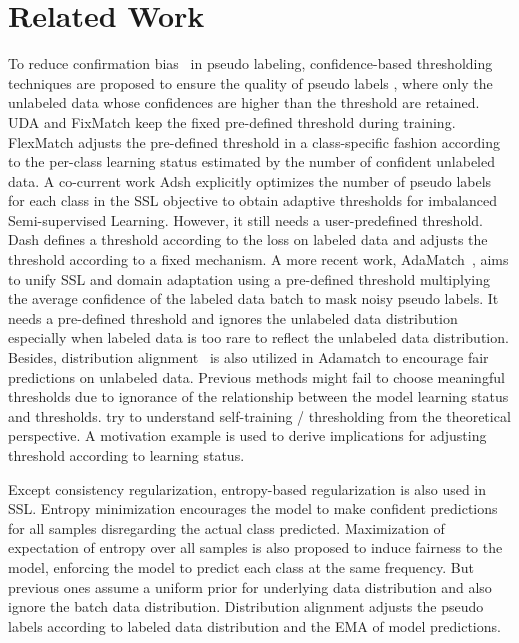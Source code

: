 \documentclass{article} \usepackage{iclr2023_conference,times}
\theoremstyle{plain}
\theoremstyle{definition}
\theoremstyle{remark}
\begin{document}
\section{Related Work}





To reduce confirmation bias~\citep{arazo2020pseudo} in pseudo labeling, confidence-based thresholding techniques are proposed to ensure the quality of pseudo labels \citep{xie2020unsupervised,sohn2020fixmatch,zhang2021flexmatch,xu2021dash}, where only the unlabeled data whose confidences are higher than the threshold are retained. UDA \citep{xie2020unsupervised} and FixMatch \citep{sohn2020fixmatch} keep the fixed pre-defined threshold during training. FlexMatch \citep{zhang2021flexmatch} adjusts the pre-defined threshold in a class-specific fashion according to the per-class learning status estimated by the number of confident unlabeled data. A co-current work Adsh \citep{guo2022class} explicitly optimizes the number of pseudo labels for each class in the SSL
objective to obtain adaptive thresholds for imbalanced Semi-supervised Learning. However, it still needs a user-predefined threshold. Dash \citep{xu2021dash} defines a threshold according to the loss on labeled data and adjusts the threshold according to a fixed mechanism. A more recent work, AdaMatch~\citep{berthelot2021adamatch}, aims to unify SSL and domain adaptation using a pre-defined threshold multiplying the average confidence of the labeled data batch to mask noisy pseudo labels. It needs a pre-defined threshold and ignores the unlabeled data distribution especially when labeled data is too rare to reflect the unlabeled data distribution. Besides, distribution alignment~\citep{berthelot2019remixmatch,berthelot2021adamatch} is also utilized in Adamatch to encourage fair predictions on unlabeled data.
Previous methods might fail to choose meaningful thresholds due to ignorance of the relationship between the model learning status and thresholds. \cite{chen2020self,kumar2020understanding} try to understand self-training / thresholding from the theoretical perspective. 
A motivation example is used to derive implications for adjusting threshold according to learning status.


Except consistency regularization, entropy-based regularization is also used in SSL. Entropy minimization \citep{grand2004ent} encourages the model to make confident predictions for all samples disregarding the actual class predicted.
Maximization of expectation of entropy \citep{krause2010disc, arazo2020pseudo} over all samples is also proposed to induce fairness to the model, enforcing the model to predict each class at the same frequency. But previous ones assume a uniform prior for underlying data distribution and also ignore the batch data distribution. Distribution alignment \citep{berthelot2019remixmatch} adjusts the pseudo labels according to labeled data distribution and the EMA of model predictions. 
%
 
\end{document}
